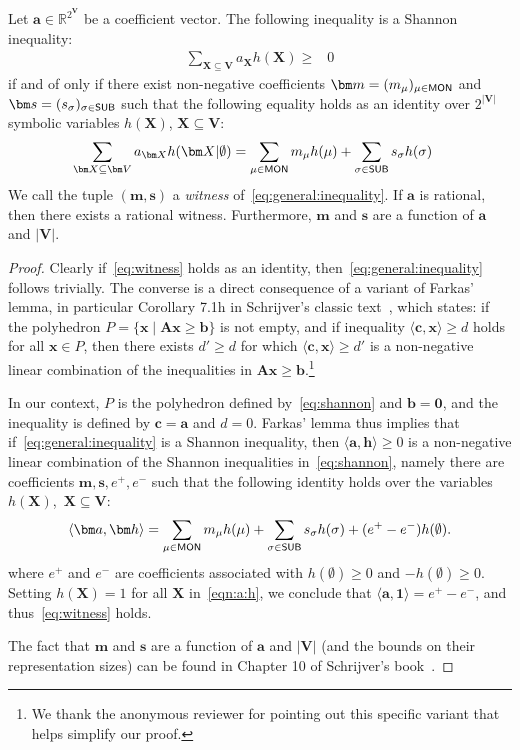 \documentclass{theoretics}
\newcommand{\inner}[1]{\langle #1 \rangle}
\newcommand{\R}{\mathbb R} %
\newcommand{\mon}{\text{\sf MON}}
\newcommand{\sub}{\text{\sf SUB}}
\begin{document}
\begin{lemma}
Let $\bm a \in \R^{2^{\bm V}}$ be a coefficient vector. The following inequality is a
Shannon inequality:
%
\begin{align}
  \sum_{\bm X \subseteq \bm V} a_{\bm X}h(\bm X) \geq & 0 \label{eq:general:inequality}
\end{align}
if and of only if there exist non-negative coefficients
$\bm m = (m_\mu)_{\mu \in \mon}$ and $\bm s = (s_\sigma)_{\sigma \in \sub}$
such that the following equality holds as an identity over $2^{|\bm V|}$ symbolic variables
$h(\bm X)$, $\bm X \subseteq \bm V$:
%
\begin{align}
\sum_{\bm X \subseteq \bm V} a_{\bm X}h(\bm X|\emptyset)
  &= \sum_{\mu \in \mon} m_\mu h(\mu) + \sum_{\sigma \in \sub} s_\sigma  h(\sigma)
  \label{eq:witness}
\end{align}
We call the tuple $(\bm m, \bm s)$
a {\em witness} of~\eqref{eq:general:inequality}.
If $\bm a$ is rational, then there exists a rational witness.
Furthermore, $\bm m$ and $\bm s$ are a function of $\bm a$ and $|\bm V|$.
\label{lmm:witness}
\end{lemma}
\begin{proof}
Clearly if~\eqref{eq:witness} holds as an identity, then~\eqref{eq:general:inequality}
follows trivially.
The converse is a direct consequence of a variant of Farkas' lemma, in particular
Corollary 7.1h in Schrijver's classic text~\cite{schrijver-book}, which states:
if the polyhedron $P = \{ \bm x \; | \; \bm A\bm x \geq \bm b\}$ is not empty,
and if inequality $\inner{\bm c, \bm x} \geq d$ holds for all $\bm x \in P$,
then there exists $d'\geq d$ for which $\inner{\bm c, \bm x} \geq d'$
is a non-negative linear combination of the inequalities in $\bm A\bm x
\geq \bm b$.\footnote{We thank the anonymous reviewer for pointing out this
specific variant that helps simplify our proof.}

In our context, $P$ is the polyhedron defined by~\eqref{eq:shannon}
and $\bm b = \bm 0$, and the inequality is defined by  $\bm c = \bm a$ and
$d=0$.
Farkas' lemma thus implies that if~\eqref{eq:general:inequality}
is a Shannon inequality, then $\inner{\bm a, \bm h} \geq 0$ is a non-negative linear combination
of the Shannon inequalities in~\eqref{eq:shannon}, namely there
are coefficients $\bm m,\bm s,e^+,e^-$ such that
the following identity holds
over the variables $h(\bm X)$,~$\bm X \subseteq \bm V$:
\begin{align}
\inner{\bm a, \bm h} = \sum_{\mu \in \mon} m_\mu h(\mu) + \sum_{\sigma \in \sub} s_\sigma h(\sigma)
+(e^+ - e^-)h(\emptyset).
\label{eqn:a:h}
\end{align}
where $e^+$ and $e^-$ are coefficients associated with $h(\emptyset) \geq 0$
and $-h(\emptyset) \geq 0$.
Setting $h(\bm X)=1$ for all $\bm X$ in~\eqref{eqn:a:h}, we conclude that $\inner{\bm a,\bm 1}=e^+ - e^-$,
and thus~\eqref{eq:witness} holds.

The fact that $\bm m$ and $\bm s$ are a function of $\bm a$ and $|\bm V|$ (and the bounds
on their representation sizes) can be found in Chapter 10 of Schrijver's book~\cite{schrijver-book}.
\end{proof}
\end{document}
